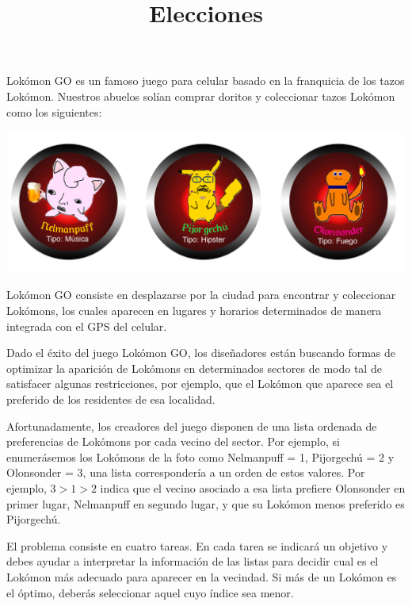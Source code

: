 \documentclass{oci}
\title{Elecciones}
\begin{document}
\begin{problemDescription}
Lok\'omon GO es un famoso juego para celular basado en la franquicia de los tazos Lok\'omon. Nuestros abuelos sol\'ian comprar doritos y coleccionar tazos Lok\'omon como los siguientes:

\begin{center}
	\includegraphics[scale=0.4]{lokomons.jpg}
\end{center}

Lok\'omon GO consiste en desplazarse por la ciudad para encontrar y coleccionar Lok\'omons, los cuales aparecen en lugares y horarios determinados de manera integrada con el GPS del celular.

Dado el \'exito del juego Lok\'omon GO, los dise\~nadores est\'an buscando formas de optimizar la aparici\'on de Lok\'omons en determinados sectores de modo tal de satisfacer algunas restricciones, por ejemplo, que el Lok\'omon que aparece sea el preferido de los residentes de esa localidad.

Afortunadamente, los creadores del juego disponen de una lista ordenada de preferencias de Lok\'omons por cada vecino del sector. Por ejemplo, si enumer\'asemos los Lok\'omons de la foto como Nelmanpuff = 1, Pijorgech\'u = 2 y Olonsonder = 3, una lista corresponder\'ia a un orden de estos valores. Por ejemplo, $3 > 1 > 2$ indica que el vecino asociado a esa lista prefiere Olonsonder en primer lugar, Nelmanpuff en segundo lugar, y que su Lok\'omon menos preferido es Pijorgech\'u.

El problema consiste en cuatro tareas. En cada tarea se indicar\'a un objetivo y debes ayudar a interpretar la informaci\'on de las listas para decidir cual es el Lok\'omon m\'as adecuado para aparecer en la vecindad. Si m\'as de un Lok\'omon es el \'optimo, deber\'as seleccionar aquel cuyo \'indice sea menor.
\end{problemDescription}
\end{document}
